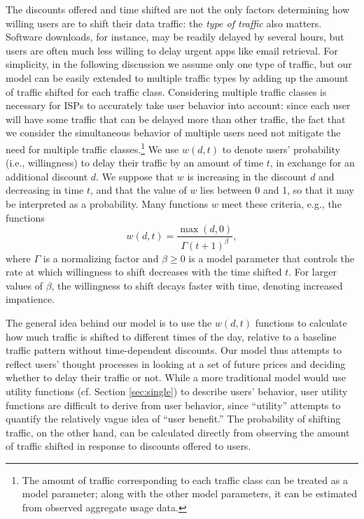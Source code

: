 The discounts offered and time shifted are not the only factors determining how willing users are to shift their data traffic: the \emph{type of traffic} also matters. Software downloads, for instance, may be readily delayed by several hours, but users are often much less willing to delay urgent apps like email retrieval. For simplicity, in the following discussion we assume only one type of traffic, but our model can be easily extended to multiple traffic types by adding up the amount of traffic shifted for each traffic class. Considering multiple traffic classes is necessary for ISPs to accurately take user behavior into account: since each user will have some traffic that can be delayed more than other traffic, the fact that we consider the simultaneous behavior of multiple users need not mitigate the need for multiple traffic classes.\footnote{The amount of traffic corresponding to each traffic class can be treated as a model parameter; along with the other model parameters, it can be estimated from observed aggregate usage data.} We use $w(d,t)$ to denote users' probability (i.e., willingness) to delay their traffic by an amount of time $t$, in exchange for an additional discount $d$. We suppose that $w$ is increasing in the discount $d$ and decreasing in time $t$, and that the value of $w$ lies between 0 and 1, so that it may be interpreted as a probability. Many functions $w$ meet these criteria, e.g., the functions
\begin{equation*}
w(d,t) = \frac{\max(d,0)}{\Gamma(t + 1)^\beta},
\end{equation*}
where $\Gamma$ is a normalizing factor and $\beta \geq 0$ is a model parameter that controls the rate at which willingness to shift decreases with the time shifted $t$. For larger values of $\beta$, the willingness to shift decays faster with time, denoting increased impatience.

The general idea behind our model is to use the $w(d,t)$ functions to calculate how much traffic is shifted to different times of the day, relative to a baseline traffic pattern without time-dependent discounts. Our model thus attempts to reflect users' thought processes in looking at a set of future prices and deciding whether to delay their traffic or not. While a more traditional model would use utility functions (cf. Section \ref{sec:single}) to describe users' behavior, user utility functions are difficult to derive from user behavior, since ``utility'' attempts to quantify the relatively vague idea of ``user benefit.'' The probability of shifting traffic, on the other hand, can be calculated directly from observing the amount of traffic shifted in response to discounts offered to users.

